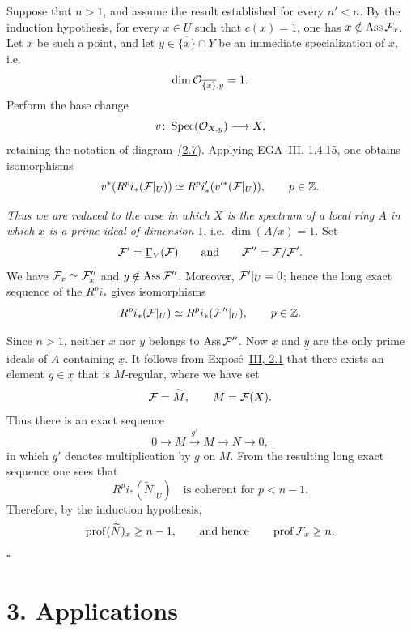 
\medskip
\noindent Suppose that $n>1$, and assume the result established for every
$n'<n$. By the induction hypothesis, for every $x\in U$ such that $c(x)=1$,
one has $x\notin\Ass\cF_x$. Let $x$ be such a point, and let
$y\in\overline{\{x\}}\cap Y$ be an immediate specialization of $x$, i.e.
\[
  \dim\mathcal O_{\overline{\{x\}},y}=1.
\]
Perform the base change
\[
  v\colon\operatorname{Spec}(\mathcal O_{X,y})\longrightarrow X,
\]
retaining the notation of diagram~\textup{\hyperref[eq:VIII.2.7]{(2.7)}}. Applying EGA~III, 1.4.15,
one obtains isomorphisms
\[
  v^*(R^p i_*(\cF|_U))
  \simeq
  R^p i'_*(v'^*(\cF|_U)),
  \qquad p\in\mathbb Z.
\]

\noindent\emph{Thus we are reduced to the case in which $X$ is the spectrum
of a local ring $A$ in which $\underline{x}$ is a prime ideal of dimension
$1$}, i.e. $\dim(A/x)=1$. Set
\[
  \cF'=\SheafGamma_Y(\cF)
  \qquad\text{and}\qquad
  \cF''=\cF/\cF'.
\]
We have $\cF_x\simeq\cF''_x$ and $y\notin\Ass\cF''$. Moreover,
$\cF'|_U=0$; hence the long exact sequence of the $R^p i_*$ gives
isomorphisms
\[
  R^p i_*(\cF|_U)
  \simeq
  R^p i_*(\cF''|_U),
  \qquad p\in\mathbb Z.
\]

\quad Since $n>1$,
neither $x$ nor $y$ belongs to $\Ass\cF''$. Now $\underline{x}$ and
$\underline{y}$ are the only prime ideals of $A$ containing $\underline{x}$.
It follows from Expos\'e~\hyperref[III.2.1]{III, 2.1} that there exists an element
$g\in\underline{x}$ that is $M$-regular, where we have set
\[
  \cF=\widetilde M,
  \qquad M=\cF(X).
\]
Thus there is an exact sequence
\[
  0\longrightarrow M\xrightarrow{g'}M\longrightarrow N\longrightarrow0,
\]
in which $g'$ denotes multiplication by $g$ on $M$. From the resulting long
exact sequence one sees that
\[
  R^p i_*(\widetilde N|_U)
  \quad\text{is coherent for }p<n-1.
\]
Therefore, by the induction hypothesis,
\[
  \prof(\widetilde N)_x\geq n-1,
  \qquad\text{and hence}\qquad
  \prof\cF_x\geq n.
\]
\hfill$\square$


\section*{3. Applications}

